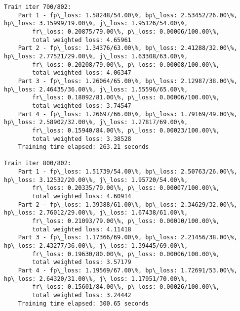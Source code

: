 \documentclass[11pt]{article}
\begin{document}
\begin{Verbatim}[commandchars=\\\{\}]
Train iter 700/802:
	Part 1 - fp\_loss: 1.58248/54.00\%, bp\_loss: 2.53452/26.00\%, hp\_loss: 3.15999/19.00\%, j\_loss: 1.95126/54.00\%, 
		fr\_loss: 0.20875/79.00\%, p\_loss: 0.00006/100.00\%, 
		total weighted loss: 4.65961
	Part 2 - fp\_loss: 1.34376/63.00\%, bp\_loss: 2.41288/32.00\%, hp\_loss: 2.77521/29.00\%, j\_loss: 1.63308/63.00\%, 
		fr\_loss: 0.20208/79.00\%, p\_loss: 0.00008/100.00\%, 
		total weighted loss: 4.06347
	Part 3 - fp\_loss: 1.26064/65.00\%, bp\_loss: 2.12987/38.00\%, hp\_loss: 2.46435/36.00\%, j\_loss: 1.55596/65.00\%, 
		fr\_loss: 0.18092/81.00\%, p\_loss: 0.00006/100.00\%, 
		total weighted loss: 3.74547
	Part 4 - fp\_loss: 1.26697/66.00\%, bp\_loss: 1.79169/49.00\%, hp\_loss: 2.58902/32.00\%, j\_loss: 1.27817/69.00\%, 
		fr\_loss: 0.15940/84.00\%, p\_loss: 0.00023/100.00\%, 
		total weighted loss: 3.38528
	Training time elapsed: 263.21 seconds

Train iter 800/802:
	Part 1 - fp\_loss: 1.51739/54.00\%, bp\_loss: 2.50763/26.00\%, hp\_loss: 3.12532/20.00\%, j\_loss: 1.95720/54.00\%, 
		fr\_loss: 0.20335/79.00\%, p\_loss: 0.00007/100.00\%, 
		total weighted loss: 4.60914
	Part 2 - fp\_loss: 1.39388/61.00\%, bp\_loss: 2.34629/32.00\%, hp\_loss: 2.76012/29.00\%, j\_loss: 1.67438/61.00\%, 
		fr\_loss: 0.21093/79.00\%, p\_loss: 0.00010/100.00\%, 
		total weighted loss: 4.11418
	Part 3 - fp\_loss: 1.17366/69.00\%, bp\_loss: 2.21456/38.00\%, hp\_loss: 2.43277/36.00\%, j\_loss: 1.39445/69.00\%, 
		fr\_loss: 0.19630/80.00\%, p\_loss: 0.00006/100.00\%, 
		total weighted loss: 3.57179
	Part 4 - fp\_loss: 1.19569/67.00\%, bp\_loss: 1.72691/53.00\%, hp\_loss: 2.64320/31.00\%, j\_loss: 1.17951/70.00\%, 
		fr\_loss: 0.15601/84.00\%, p\_loss: 0.00026/100.00\%, 
		total weighted loss: 3.24442
	Training time elapsed: 300.65 seconds


\end{Verbatim}
\end{document}
